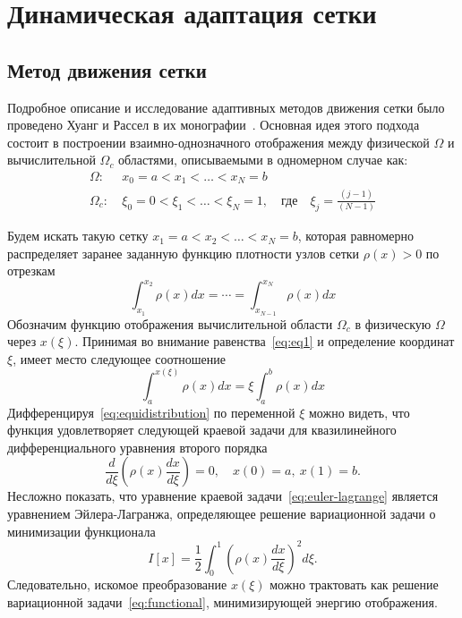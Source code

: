 \chapter{Динамическая адаптация сетки} \label{ch:ch2}

\section{Метод движения сетки}
Подробное описание и исследование адаптивных методов движения сетки было проведено Хуанг и Рассел в их монографии~\cite{huang2010adaptive}. Основная идея этого подхода состоит в построении взаимно-однозначного отображения между физической $\Omega$ и вычислительной $\Omega_c$  областями, описываемыми в одномерном случае как:
\begin{align}
\Omega:&\ x_0=a<x_1<\dots<x_N = b \\
\Omega_c:&\ \xi_0=0<\xi_1<\dots<\xi_N = 1,\quad \text{где}\quad \xi_j = \frac{(j-1)}{(N-1)}
\end{align}

Будем искать такую сетку $x_1 = a<x_2<\dots<x_N=b$, которая равномерно распределяет заранее заданную функцию плотности узлов сетки  $\rho(x) > 0$ по отрезкам
\begin{equation}
\int_{x_1}^{x_2}\rho(x)dx = \cdots = \int_{x_{N-1}}^{x_N}\rho(x)dx
\label{eq:eq1}
\end{equation}
Обозначим функцию отображения вычислительной области $\Omega_c$  в физическую $\Omega$ через $x(\xi)$. Принимая во внимание равенства~\eqref{eq:eq1} и определение координат $\xi$, имеет место следующее соотношение
\begin{equation}
\int_{a}^{x(\xi)}\rho(x)dx = \xi \int_{a}^{b}\rho(x)dx
\label{eq:equidistribution}
\end{equation}
Дифференцируя~\eqref{eq:equidistribution} по переменной $\xi$ можно видеть, что функция   удовлетворяет следующей краевой задачи для квазилинейного дифференциального уравнения второго порядка
\begin{equation}
\frac{d}{d\xi}\left(\rho(x)\frac{dx}{d\xi} \right) = 0, \quad x(0)=a, \ x(1) = b.	
\label{eq:euler-lagrange}
\end{equation}
Несложно показать, что уравнение краевой задачи~\eqref{eq:euler-lagrange} является уравнением Эйлера-Лагранжа, определяющее решение вариационной задачи о минимизации функционала 
\begin{equation}
I[x] = \frac{1}{2}\int_{0}^{1}\left(\rho(x)\frac{dx}{d\xi} \right)^2d\xi.
\label{eq:functional}
\end{equation}
Следовательно, искомое преобразование $x(\xi)$  можно трактовать как решение вариационной задачи~\eqref{eq:functional}, минимизирующей энергию отображения.


